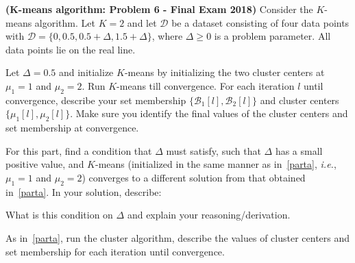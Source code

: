 \documentclass{article}
\theoremstyle{definition}
\begin{document}
\begin{question}[start=1]
	\item \textbf{(K-means algorithm: Problem 6 - Final Exam 2018)} Consider the $K$-means algorithm. Let $K = 2$ and let $\mathcal{D}$ be a dataset consisting of four data points with $\mathcal{D} = \{0, 0.5, 0.5 + \Delta, 1.5 + \Delta\}$, where $\Delta \geq 0$ is a problem parameter. All data points lie on the real line.
	\begin{question}
		\item \label{parta}Let $\Delta = 0.5$ and initialize $K$-means by initializing the two cluster centers at $\mu_1 = 1$ and $\mu_2 = 2$. Run $K$-means till convergence. For each iteration $l$ until convergence, describe your set membership $\{\mathcal{B}_1[l], \mathcal{B}_2[l]\}$ and cluster centers $\{\mu_1[l], \mu_2[l]\}$. Make sure you identify the final values of the cluster centers and set membership at convergence.
		\item For this part, find a condition that $\Delta$ must satisfy, such that $\Delta$ has a small positive value, and $K$-means (initialized in the same manner as in~\ref{parta}, \textit{i.e.}, $\mu_1 = 1$ and $\mu_2 = 2$) converges to a different solution from that obtained in~\ref{parta}. In your solution, describe:
		\begin{question}
			\item What is this condition on $\Delta$ and explain your reasoning/derivation.
			\item As in~\ref{parta}, run the cluster algorithm, describe the values of cluster centers and set membership for each iteration until convergence.
		\end{question}
	\end{question}
	

\end{question}
\end{document}
